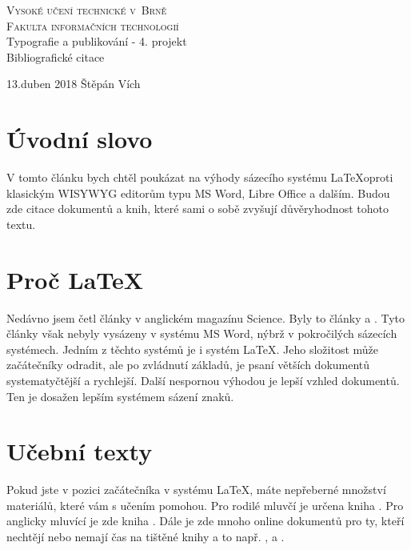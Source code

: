 \documentclass[11pt,titlepage,a4paper]{article}
\begin{document}
\begin{titlepage}

\begin{center}

\textsc{\Huge{Vysoké učení technické v~Brně} \\[3mm] \huge{Fakulta informačních technologií}}\\ 
\huge{Typografie a publikování - 4. projekt}\\[0mm]
\Huge{Bibliografické citace}


\Large{13.duben 2018 \hfill
Štěpán Vích}
\end{center}
\end{titlepage}


\section{Úvodní slovo}

V tomto článku bych chtěl poukázat na výhody sázecího systému \LaTeX oproti klasickým WISYWYG editorům typu MS Word, Libre Office a dalším. Budou zde citace dokumentů a knih, které sami o sobě zvyšují důvěryhodnost tohoto textu. 


\section{Proč \LaTeX}

Nedávno jsem četl články v anglickém magazínu Science. Byly to články \cite{science1} a \cite{science2}. Tyto články však nebyly vysázeny v systému MS Word, nýbrž v pokročilých sázecích systémech. Jedním z těchto systémů je i systém \LaTeX. Jeho složitost může začátečníky odradit, ale po zvládnutí základů, je psaní větších dokumentů systematyčtější a rychlejší. Další nespornou výhodou je lepší vzhled dokumentů. Ten je dosažen lepším systémem sázení znaků.

\section{Učební texty}

Pokud jste v pozici začátečníka v systému \LaTeX, máte nepřeberné množství materiálů, které vám s učením pomohou. Pro rodilé mluvčí je určena kniha \cite{rybicka}. Pro anglicky mluvící je zde kniha \cite{latex-beginners-guide}. Dále je zde mnoho online dokumentů pro ty, kteří nechtějí nebo nemají čas na tištěné knihy a to např. \cite{dokument1}, \cite{dokument2} a \cite{dokument3}.
\end{document}
